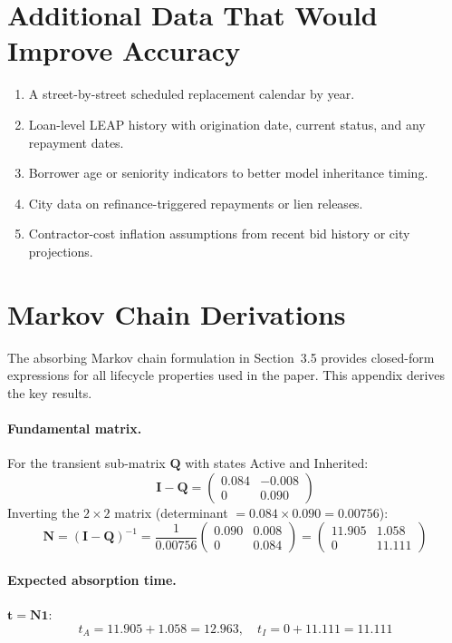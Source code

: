 \documentclass[11pt, letterpaper]{article}
\begin{document}
\section{Additional Data That Would Improve Accuracy}

\begin{enumerate}[nosep]
  \item A street-by-street scheduled replacement calendar by year.
  \item Loan-level LEAP history with origination date, current status, and any repayment dates.
  \item Borrower age or seniority indicators to better model inheritance timing.
  \item City data on refinance-triggered repayments or lien releases.
  \item Contractor-cost inflation assumptions from recent bid history or city projections.
\end{enumerate}

\section{Markov Chain Derivations}

The absorbing Markov chain formulation in Section~3.5 provides closed-form expressions for all lifecycle properties used in the paper. This appendix derives the key results.

\paragraph{Fundamental matrix.} For the transient sub-matrix $\mathbf{Q}$ with states Active and Inherited:
\[
  \mathbf{I} - \mathbf{Q} =
  \begin{pmatrix} 0.084 & -0.008 \\ 0 & 0.090
  \end{pmatrix}
\]
Inverting the $2 \times 2$ matrix (determinant $= 0.084 \times 0.090 = 0.00756$):
\[
  \mathbf{N} = (\mathbf{I} - \mathbf{Q})^{-1} = \frac{1}{0.00756}
  \begin{pmatrix} 0.090 & 0.008 \\ 0 & 0.084
  \end{pmatrix} =
  \begin{pmatrix} 11.905 & 1.058 \\ 0 & 11.111
  \end{pmatrix}
\]

\paragraph{Expected absorption time.} $\mathbf{t} = \mathbf{N}\mathbf{1}$:
\[
  t_A = 11.905 + 1.058 = 12.963, \quad t_I = 0 + 11.111 = 11.111
\]
\end{document}
